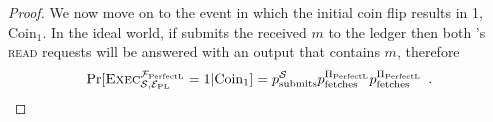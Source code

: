\begin{proof}
    We now move on to the event in which the initial coin flip results in 1,
    $\mathrm{Coin}_1$. In the ideal world, if \simulator{} submits the received
    $m$ to the ledger then both \environment's \textsc{read} requests will be
    answered with an output that contains $m$, therefore
    \begin{equation}
    \label{eq:coin1:ideal}
      \Pr[\textsc{Exec}^{\perfectledger}_{\simulator, \perfectenv} = 1 |
      \mathrm{Coin}_1] = \pssubmits \ppfetches \ppfetches \enspace.
    \end{equation}
  \end{proof}
